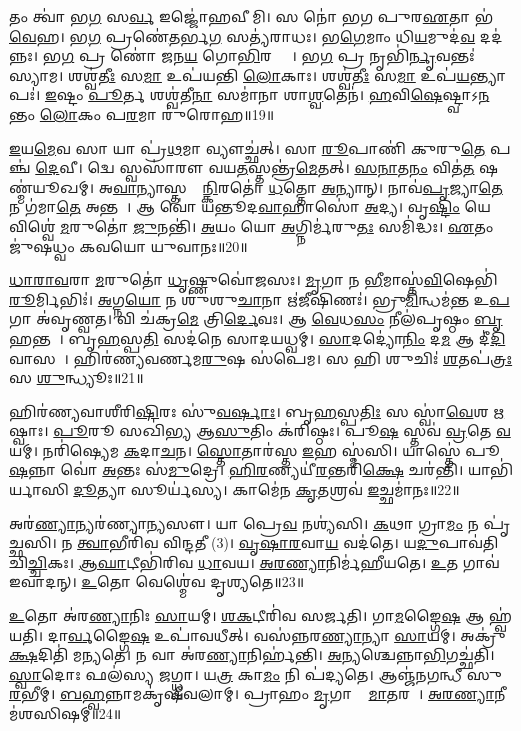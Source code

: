 𑌤𑌂 𑌤𑍍𑌵𑌾॑ 𑌭\ul{𑌗} 𑌸\ul{𑌰𑍍𑌵} 𑌇𑌜𑍍𑌜𑍋॑𑌹𑌵𑍀𑌮𑌿।
𑌸 𑌨𑍋॑ 𑌭𑌗 𑌪𑍁𑌰\ul{𑌏}𑌤𑌾 𑌭॑\ul{𑌵𑍇}𑌹।
𑌭\ul{𑌗} 𑌪𑍍𑌰𑌣𑍇॑\ul{𑌤}𑌰𑍍𑌭\ul{𑌗} 𑌸𑌤𑍍𑌯॑𑌰𑌾𑌧𑌃।
𑌭\ul{𑌗𑍇}𑌮𑌾𑌂 𑌧𑌿\ul{𑌯}𑌮𑍁𑌦॑\ul{𑌵} 𑌦𑌦॑𑌨𑍍𑌨𑌃।
𑌭\ul{𑌗} 𑌪𑍍𑌰 𑌣𑍋॑ 𑌜𑌨\ul{𑌯} 𑌗𑍋\ul{𑌭𑌿}𑌰𑌶𑍍𑌵𑍈𑌃᳚।
𑌭\ul{𑌗} 𑌪𑍍𑌰 𑌨𑍃𑌭𑌿॑\ul{𑌰𑍍𑌨𑍃}𑌵𑌨𑍍𑌤𑌃॑ 𑌸𑍍𑌯𑌾𑌮।
𑌶𑌶𑍍𑌵॑\ul{𑌤𑍀𑌃} 𑌸\ul{𑌮𑌾} 𑌉𑌪॑𑌯𑌨𑍍𑌤𑌿 \ul{𑌲𑍋}𑌕𑌾𑌃।
𑌶𑌶𑍍𑌵॑\ul{𑌤𑍀𑌃} 𑌸\ul{𑌮𑌾} 𑌉𑌪॑\ul{𑌯}𑌨𑍍𑌤𑍍𑌯𑌾𑌪𑌃॑।
\ul{𑌇}𑌷𑍍𑌟𑌂 \ul{𑌪𑍂}𑌰𑍍𑌤 𑌶𑌶𑍍𑌵॑𑌤𑍀\ul{𑌨𑌾}\ul{} 𑌸𑌮𑌾॑𑌨𑌾 𑌶𑌾\ul{𑌶𑍍𑌵}𑌤𑍇𑌨॑।
\ul{𑌹}𑌵𑌿\ul{𑌷𑍇}𑌷𑍍𑌟𑍍𑌵𑌾\-𑌽\ul{𑌨}𑌨𑍍𑌤𑌂 \ul{𑌲𑍋}𑌕𑌂 𑌪\ul{𑌰}𑌮𑌾 𑌰𑍁॑𑌰𑍋𑌹॥19॥

\ul{𑌇}𑌯\ul{𑌮𑍇}𑌵 𑌸𑌾 𑌯𑌾 𑌪𑍍𑌰॑\ul{𑌥}𑌮𑌾 𑌵𑍍𑌯𑍗𑌚𑍍𑌛॑𑌤𑍍।
𑌸𑌾 \ul{𑌰𑍂}𑌪𑌾𑌣𑌿॑ 𑌕𑍁𑌰𑍁\ul{𑌤𑍇} 𑌪𑌞𑍍𑌚॑ \ul{𑌦𑍇}𑌵𑍀।
𑌦𑍍𑌵𑍇 𑌸𑍍𑌵𑌸𑌾॑𑌰𑍗 𑌵𑌯\ul{𑌤}𑌸𑍍𑌤𑌨𑍍𑌤𑍍𑌰॑\ul{𑌮𑍇}𑌤𑌤𑍍।
\ul{𑌸}\ul{𑌨𑌾}𑌤\ul{𑌨𑌂} 𑌵𑌿𑌤॑\ul{𑌤}\ul{} 𑌷𑌣𑍍𑌮॑𑌯𑍂𑌖𑌮𑍍।
𑌅\ul{𑌵𑌾}𑌨𑍍𑌯𑌾𑌸𑍍𑌤𑌨𑍍𑌤𑍂᳚\ul{𑌨𑍍𑌕𑌿}𑌰𑌤𑍋॑ \ul{𑌧}𑌤𑍍𑌤𑍋 \ul{𑌅}𑌨𑍍𑌯𑌾𑌨𑍍।
𑌨𑌾𑌵॑\ul{𑌪𑍃}𑌜𑍍𑌯𑌾\ul{𑌤𑍇} 𑌨 𑌗॑𑌮𑌾\ul{𑌤𑍇} 𑌅𑌨𑍍𑌤𑌮𑍍᳚।
𑌆 𑌵𑍋॑ 𑌯𑌨𑍍𑌤𑍂𑌦\ul{𑌵𑌾}𑌹𑌾𑌸𑍋॑ \ul{𑌅}𑌦𑍍𑌯।
𑌵𑍃\ul{𑌷𑍍𑌟𑌿𑌂} 𑌯𑍇 𑌵𑌿𑌶𑍍𑌵𑍇॑ \ul{𑌮}𑌰𑍁𑌤𑍋॑ \ul{𑌜𑍁}𑌨𑌨𑍍𑌤𑌿॑।
\ul{𑌅}𑌯𑌂 𑌯𑍋 \ul{𑌅}𑌗𑍍𑌨𑌿𑌰𑍍𑌮॑𑌰𑍁\ul{𑌤𑌃} 𑌸𑌮𑌿॑𑌦𑍍𑌧𑌃।
\ul{𑌏}𑌤𑌂 𑌜𑍁॑𑌷𑌧𑍍𑌵𑌂 𑌕𑌵𑌯𑍋 𑌯𑍁𑌵𑌾𑌨𑌃॥20॥

\ul{𑌧𑌾}\ul{𑌰𑌾}\ul{𑌵}𑌰𑌾 \ul{𑌮}𑌰𑍁𑌤𑍋॑ \ul{𑌧𑍃}𑌷𑍍𑌣𑍁𑌵𑍋॑𑌜𑌸𑌃।
\ul{𑌮𑍃}𑌗𑌾 𑌨 \ul{𑌭𑍀}𑌮𑌾𑌸𑍍𑌤॑\ul{𑌵𑌿}𑌷𑍇𑌭𑌿॑\-\ul{𑌰𑍂}𑌰𑍍𑌮𑌿𑌭𑌿𑌃॑।
\ul{𑌅}𑌗𑍍𑌨\ul{𑌯𑍋} 𑌨 𑌶𑍁॑𑌶𑍁\ul{𑌚𑌾}𑌨𑌾 𑌋॑\ul{𑌜𑍀}𑌷𑌿𑌣𑌃॑।
𑌭𑍍𑌰𑍁\ul{𑌮𑌿}𑌨𑍍𑌧𑌮॑\ul{𑌨𑍍𑌤} 𑌉\ul{𑌪} 𑌗𑌾 𑌅॑𑌵𑍃𑌣𑍍𑌵𑌤।
𑌵𑌿 𑌚॑𑌕𑍍𑌰\ul{𑌮𑍇} 𑌤𑍍𑌰𑌿\ul{𑌰𑍍𑌦𑍇}𑌵𑌃।
𑌆 \ul{𑌵𑍇}𑌧\ul{𑌸𑌂} 𑌨𑍀𑌲॑𑌪𑍃𑌷𑍍𑌠𑌂 \ul{𑌬𑍃}𑌹𑌨𑍍𑌤𑌮𑍍᳚।
𑌬𑍃\ul{𑌹}𑌸𑍍𑌪\ul{𑌤𑌿}\ul{} 𑌸𑌦॑𑌨𑍇 𑌸𑌾𑌦𑌯𑌧𑍍𑌵𑌮𑍍।
\ul{𑌸𑌾}𑌦𑌦𑍍𑌯𑍋॑\ul{𑌨𑌿𑌂} 𑌦\ul{𑌮} 𑌆 𑌦𑍀॑\ul{𑌦𑌿}𑌵𑌾𑌸𑌮𑍍᳚।
𑌹𑌿𑌰॑𑌣𑍍𑌯𑌵𑌰𑍍𑌣𑌮\ul{𑌰𑍁}𑌷 𑌸॑𑌪𑍇𑌮।
𑌸 𑌹𑌿 𑌶𑍁𑌚𑌿𑌃॑ \ul{𑌶}𑌤𑌪॑\ul{𑌤𑍍𑌰𑌃} 𑌸 \ul{𑌶𑍁}𑌨𑍍𑌧𑍍𑌯𑍂𑌃॥21॥

𑌹𑌿𑌰॑𑌣𑍍𑌯𑌵𑌾𑌶𑍀𑌰𑌿\ul{𑌷𑌿}𑌰𑌃 𑌸𑍁॑\ul{𑌵}\ul{𑌰𑍍}𑌷𑌾𑌃।
𑌬𑍃\ul{𑌹}𑌸𑍍𑌪\ul{𑌤𑌿𑌃} 𑌸 𑌸𑍍𑌵𑌾॑\ul{𑌵𑍇}𑌶 \ul{𑌋}𑌷𑍍𑌵𑌾𑌃।
\ul{𑌪𑍂}𑌰𑍂 𑌸𑌖𑌿॑𑌭𑍍𑌯 𑌆\ul{𑌸𑍁}𑌤𑌿𑌂 𑌕॑𑌰𑌿𑌷𑍍𑌠𑌃।
𑌪𑍂\ul{𑌷}\ul{} 𑌸𑍍𑌤𑌵॑ \ul{𑌵𑍍𑌰}𑌤𑍇 \ul{𑌵}𑌯𑌮𑍍।
𑌨𑌰𑌿॑𑌷𑍍𑌯𑍇𑌮 \ul{𑌕}𑌦𑌾\ul{𑌚}𑌨।
\ul{𑌸𑍍𑌤𑍋}𑌤𑌾𑌰॑𑌸𑍍𑌤 \ul{𑌇}𑌹 𑌸𑍍𑌮॑𑌸𑌿।
𑌯𑌾𑌸𑍍𑌤𑍇॑ 𑌪𑍂\ul{𑌷}𑌨𑍍𑌨𑌾 𑌵𑍋॑ \ul{𑌅}𑌨𑍍𑌤𑌃 𑌸॑\ul{𑌮𑍁}𑌦𑍍𑌰𑍇।
\ul{𑌹𑌿}\ul{𑌰}𑌣𑍍𑌯𑌯𑍀॑\ul{𑌰}𑌨𑍍𑌤𑌰𑌿॑\ul{𑌕𑍍𑌷𑍇} 𑌚𑌰॑𑌨𑍍𑌤𑌿।
𑌯𑌾𑌭𑌿॑𑌰𑍍𑌯𑌾𑌸𑌿 \ul{𑌦𑍂}𑌤𑍍𑌯𑌾 𑌸𑍂𑌰𑍍𑌯॑𑌸𑍍𑌯।
𑌕𑌾𑌮𑍇॑𑌨 \ul{𑌕𑍃}𑌤𑌶𑍍𑌰𑌵॑ \ul{𑌇}𑌚𑍍𑌛𑌮𑌾॑𑌨𑌃॥22॥

𑌅𑌰॑\ul{𑌣𑍍𑌯𑌾}𑌨𑍍𑌯𑌰॑𑌣𑍍𑌯𑌾\ul{𑌨𑍍𑌯}𑌸𑍗।
𑌯𑌾 𑌪𑍍𑌰𑍇\ul{𑌵} 𑌨𑌶𑍍𑌯॑𑌸𑌿।
\ul{𑌕}𑌥𑌾 𑌗𑍍𑌰𑌾\ul{𑌮𑌂} 𑌨 𑌪𑍃॑𑌚𑍍𑌛𑌸𑌿।
𑌨 \ul{𑌤𑍍𑌵𑌾}𑌭𑍀𑌰𑌿॑𑌵 𑌵𑌿𑌨𑍍𑌦𑌤𑍀 (3)।
\ul{𑌵𑍃}\ul{𑌷𑌾}\ul{𑌰}𑌵𑌾\ul{𑌯} 𑌵𑌦॑𑌤𑍇।
𑌯\ul{𑌦𑍁}𑌪𑌾𑌵॑𑌤𑌿 𑌚𑌿\ul{𑌚𑍍𑌚𑌿}𑌕𑌃।
\ul{𑌆}\ul{𑌘𑌾}𑌟𑍀𑌭𑌿॑𑌰𑌿𑌵 \ul{𑌧𑌾}𑌵𑌯\sn{}।
\ul{𑌅}\ul{𑌰}\ul{𑌣𑍍𑌯𑌾}𑌨𑌿𑌰𑍍𑌮॑𑌹𑍀𑌯𑌤𑍇।
\ul{𑌉}𑌤 𑌗𑌾𑌵॑ 𑌇𑌵𑌾𑌦𑌨𑍍।
\ul{𑌉}𑌤𑍋 𑌵𑍇𑌶𑍍𑌮𑍇॑𑌵 𑌦𑍃𑌶𑍍𑌯𑌤𑍇॥23॥

\ul{𑌉}𑌤𑍋 𑌅॑𑌰\ul{𑌣𑍍𑌯𑌾}𑌨𑌿𑌃 \ul{𑌸𑌾}𑌯𑌮𑍍।
\ul{𑌶}\ul{𑌕}𑌟𑍀𑌰𑌿॑𑌵 𑌸𑌰𑍍𑌜𑌤𑌿।
𑌗𑌾\ul{𑌮}𑌙𑍍𑌗𑍈\ul{𑌷} 𑌆 𑌹𑍍𑌵॑𑌯𑌤𑌿।
𑌦𑌾\ul{𑌰𑍍𑌵}𑌙𑍍𑌗𑍈\ul{𑌷} 𑌉𑌪𑌾॑𑌵𑌧𑍀𑌤𑍍।
𑌵𑌸॑𑌨𑍍𑌨𑌰\ul{𑌣𑍍𑌯𑌾}𑌨𑍍𑌯𑌾 \ul{𑌸𑌾}𑌯𑌮𑍍।
𑌅𑌕𑍍𑌰𑍁॑\ul{𑌕𑍍𑌷}𑌦𑌿𑌤𑌿॑ 𑌮𑌨𑍍𑌯𑌤𑍇।
𑌨 𑌵𑌾 𑌅॑𑌰\ul{𑌣𑍍𑌯𑌾}𑌨𑌿𑌰𑍍\mbox{}𑌹॑𑌨𑍍𑌤𑌿।
\ul{𑌅}𑌨𑍍𑌯𑌶𑍍𑌚𑍇𑌨𑍍𑌨𑌾\ul{𑌭𑌿}𑌗𑌚𑍍𑌛॑𑌤𑌿।
\ul{𑌸𑍍𑌵𑌾}𑌦𑍋𑌃 𑌫𑌲॑𑌸𑍍𑌯 \ul{𑌜}𑌗𑍍𑌧𑍍𑌵𑌾।
𑌯\ul{𑌤𑍍𑌰} 𑌕𑌾\ul{𑌮𑌂} 𑌨𑌿 𑌪॑𑌦𑍍𑌯𑌤𑍇।
𑌆𑌞𑍍𑌜॑𑌨𑌗𑌨𑍍𑌧𑍀 𑌸𑍁\ul{𑌰}𑌭𑍀𑌮𑍍।
\ul{𑌬}\ul{𑌹𑍍𑌵}𑌨𑍍𑌨𑌾𑌮𑌕𑍃॑𑌷𑍀𑌵𑌲𑌾𑌮𑍍।
𑌪𑍍𑌰𑌾𑌹𑌂 \ul{𑌮𑍃}𑌗𑌾𑌣𑌾𑌂᳚ \ul{𑌮𑌾}𑌤𑌰𑌮𑍍᳚।
\ul{𑌅}\ul{𑌰}\ul{𑌣𑍍𑌯𑌾}𑌨𑍀𑌮॑𑌶𑌸𑌿𑌷𑌮𑍍॥24॥\anuvakamend[\ul{𑌸𑍍𑌯𑌾}\ul{𑌮} \ul{𑌰𑍁}\ul{𑌰𑍋}\ul{𑌹} \ul{𑌯𑍁}\ul{𑌵𑌾}\ul{𑌨𑌃} \ul{𑌶𑍁}𑌨𑍍𑌧𑍍𑌯𑍂\ul{𑌰𑌿}𑌚𑍍𑌛𑌮𑌾॑𑌨𑍋 𑌦𑍃𑌶𑍍𑌯\ul{𑌤𑍇} 𑌨𑌿𑌪॑𑌦𑍍𑌯𑌤𑍇 \ul{𑌚}𑌤𑍍𑌵𑌾𑌰𑌿॑ 𑌚]

